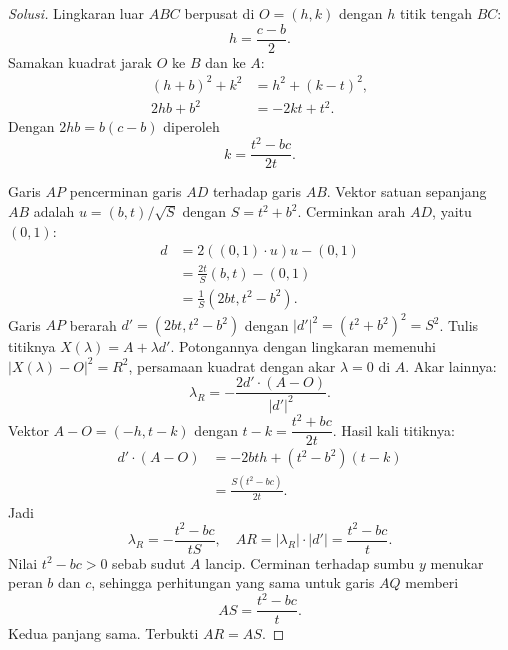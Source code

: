 \documentclass[12pt]{scrartcl}
\begin{document}
\begin{enumerate}[resume]
\begin{proof}[Solusi]
	Lingkaran luar $ABC$ berpusat di $O = (h,k)$ dengan $h$
	titik tengah $BC$:
	\[ h = \frac{c - b}{2}. \]
	Samakan kuadrat jarak $O$ ke $B$ dan ke $A$:
	\begin{align*}
	(h + b)^2 + k^2 &= h^2 + (k - t)^2, \\
	2hb + b^2 &= -2kt + t^2.
	\end{align*}
	Dengan $2hb = b(c - b)$ diperoleh
	\[ k = \frac{t^2 - bc}{2t}. \]

	Garis $AP$ pencerminan garis $AD$ terhadap garis $AB$.
	Vektor satuan sepanjang $AB$ adalah $u = (b,t)/\sqrt{S}$ dengan
	$S = t^2 + b^2$. Cerminkan arah $AD$, yaitu $(0,1)$:
	\begin{align*}
	d &= 2((0,1)\cdot u)u - (0,1) \\
	&= \frac{2t}{S}(b,t) - (0,1) \\
	&= \frac{1}{S}(2bt, t^2 - b^2).
	\end{align*}
	Garis $AP$ berarah $d' = (2bt, t^2 - b^2)$ dengan
	$|d'|^2 = (t^2 + b^2)^2 = S^2$.
	Tulis titiknya $X(\lambda) = A + \lambda d'$. Potongannya dengan
	lingkaran memenuhi $|X(\lambda) - O|^2 = R^2$, persamaan kuadrat
	dengan akar $\lambda = 0$ di $A$. Akar lainnya:
	\[ \lambda_R = -\frac{2d'\cdot(A - O)}{|d'|^2}. \]
	Vektor $A - O = (-h, t - k)$ dengan
	$t - k = \dfrac{t^2 + bc}{2t}$. Hasil kali titiknya:
	\begin{align*}
	d'\cdot(A - O) &= -2bth + (t^2 - b^2)(t - k) \\
	&= \frac{S(t^2 - bc)}{2t}.
	\end{align*}
	Jadi
	\[ \lambda_R = -\frac{t^2 - bc}{tS}, \quad
	AR = |\lambda_R|\cdot|d'| = \frac{t^2 - bc}{t}. \]
	Nilai $t^2 - bc > 0$ sebab sudut $A$ lancip.
	Cerminan terhadap sumbu $y$ menukar peran $b$ dan $c$, sehingga perhitungan
	yang sama untuk garis $AQ$ memberi
	\[ AS = \frac{t^2 - bc}{t}. \]
	Kedua panjang sama. Terbukti $AR = AS$.
	\end{proof}

\end{enumerate}
\end{document}
